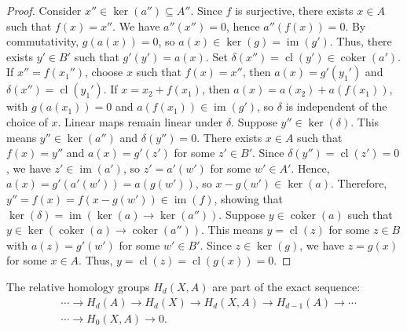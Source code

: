 \begin{proof}
	Consider \( x'' \in \ker(a'') \subseteq A'' \). Since \( f \) is surjective, there exists \( x \in A \) such that \( f(x) = x'' \). We have \( a''(x'') = 0 \), hence \( a''(f(x)) = 0 \). By commutativity, \( g(a(x)) = 0 \), so \( a(x) \in \ker(g) = \operatorname{im}(g') \). Thus, there exists \( y' \in B' \) such that \( g'(y') = a(x) \). Set \( \delta(x'') = \operatorname{cl}(y') \in \operatorname{coker}(a') \). If \( x'' = f(x_1'') \), choose \( x \) such that \( f(x) = x'' \), then \( a(x) = g'(y_1') \) and \( \delta(x'') = \operatorname{cl}(y_1') \). If \( x = x_2 + f(x_1) \), then \( a(x) = a(x_2) + a(f(x_1)) \), with \( g(a(x_1)) = 0 \) and \( a(f(x_1)) \in \operatorname{im}(g') \), so \( \delta \) is independent of the choice of \( x \). Linear maps remain linear under \( \delta \). Suppose \( y'' \in \ker(\delta) \). This means \( y'' \in \ker(a'') \) and \( \delta(y'') = 0 \). There exists \( x \in A \) such that \( f(x) = y'' \) and \( a(x) = g'(z') \) for some \( z' \in B' \). Since \( \delta(y'') = \operatorname{cl}(z') = 0 \), we have \( z' \in \operatorname{im}(a') \), so \( z' = a'(w') \) for some \( w' \in A' \). Hence, \( a(x) = g'(a'(w')) = a(g(w')) \), so \( x - g(w') \in \ker(a) \). Therefore, \( y'' = f(x) = f(x - g(w')) \in \operatorname{im}(f) \), showing that \( \ker(\delta) = \operatorname{im}(\ker(a) \rightarrow \ker(a'')) \). Suppose \( y \in \operatorname{coker}(a) \) such that \( y \in \ker(\operatorname{coker}(a) \rightarrow \operatorname{coker}(a'')) \). This means \( y = \operatorname{cl}(z) \) for some \( z \in B \) with \( a(z) = g'(w') \) for some \( w' \in B' \). Since \( z \in \ker(g) \), we have \( z = g(x) \) for some \( x \in A \). Thus, \( y = \operatorname{cl}(z) = \operatorname{cl}(g(x)) = 0 \).
\end{proof}

\begin{theorem}{\cite[p. 115 f.]{hatcher2005algebraic}}
	The relative homology groups \( H_{d}(X, A) \) are part of the exact sequence:
	\begin{align}
		  & \cdots \rightarrow H_{d}(A) \rightarrow H_{d}(X) \rightarrow H_{d}(X, A) \rightarrow H_{d-1}(A) \rightarrow \cdots \\
		  & \cdots \rightarrow H_{0}(X, A) \rightarrow 0.                                                                      
	\end{align}
\end{theorem}

